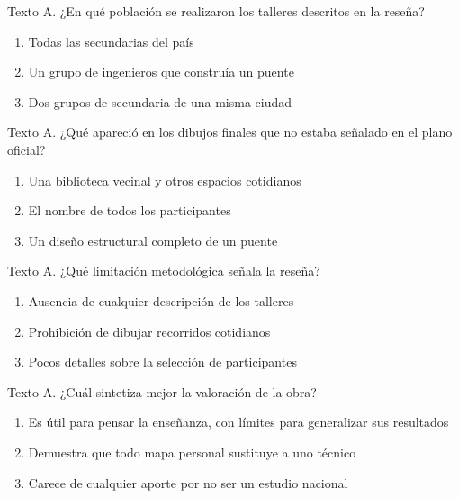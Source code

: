 

\noindent\begin{minipage}{\linewidth}\setlength{\parskip}{4pt}\label{q:L-001}
Texto A. ¿En qué población se realizaron los talleres descritos en la reseña?
\begin{enumerate}[label=\Alph*),nosep]
\item Todas las secundarias del país
\item Un grupo de ingenieros que construía un puente
\item Dos grupos de secundaria de una misma ciudad
\end{enumerate}\end{minipage}\par\medskip

\noindent\begin{minipage}{\linewidth}\setlength{\parskip}{4pt}\label{q:L-002}
Texto A. ¿Qué apareció en los dibujos finales que no estaba señalado en el plano oficial?
\begin{enumerate}[label=\Alph*),nosep]
\item Una biblioteca vecinal y otros espacios cotidianos
\item El nombre de todos los participantes
\item Un diseño estructural completo de un puente
\end{enumerate}\end{minipage}\par\medskip

\noindent\begin{minipage}{\linewidth}\setlength{\parskip}{4pt}\label{q:L-003}
Texto A. ¿Qué limitación metodológica señala la reseña?
\begin{enumerate}[label=\Alph*),nosep]
\item Ausencia de cualquier descripción de los talleres
\item Prohibición de dibujar recorridos cotidianos
\item Pocos detalles sobre la selección de participantes
\end{enumerate}\end{minipage}\par\medskip

\noindent\begin{minipage}{\linewidth}\setlength{\parskip}{4pt}\label{q:L-004}
Texto A. ¿Cuál sintetiza mejor la valoración de la obra?
\begin{enumerate}[label=\Alph*),nosep]
\item Es útil para pensar la enseñanza, con límites para generalizar sus resultados
\item Demuestra que todo mapa personal sustituye a uno técnico
\item Carece de cualquier aporte por no ser un estudio nacional
\end{enumerate}\end{minipage}\par\medskip

